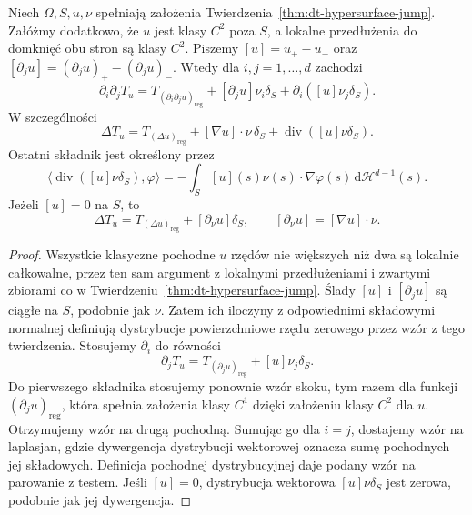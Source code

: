\begin{twierdzenie}
\label{thm:dt-second-interface}
Niech $\Omega,S,u,\nu$ spełniają założenia
Twierdzenia~\ref{thm:dt-hypersurface-jump}.
Załóżmy dodatkowo, że $u$ jest klasy $C^2$ poza $S$,
a lokalne przedłużenia do domknięć obu stron są klasy $C^2$.
Piszemy $[u]=u_+-u_-$ oraz
$[\partial_j u]=(\partial_j u)_+-(\partial_j u)_-$.
Wtedy dla $i,j=1,\ldots,d$ zachodzi
\[
 \partial_i\partial_j T_u
 =T_{(\partial_i\partial_j u)_{\mathrm{reg}}}
 +[\partial_j u]\nu_i\delta_S
 +\partial_i([u]\nu_j\delta_S).
\]
W szczególności
\[
 \Delta T_u
 =T_{(\Delta u)_{\mathrm{reg}}}
 +[\nabla u]\cdot\nu\,\delta_S
 +\operatorname{div}([u]\nu\delta_S).
\]
Ostatni składnik jest określony przez
\[
 \langle\operatorname{div}([u]\nu\delta_S),\varphi\rangle
 =-\int_S [u](s)\nu(s)\cdot\nabla\varphi(s)\,
 \mathrm d\mathcal H^{d-1}(s).
\]
Jeżeli $[u]=0$ na $S$, to
\[
 \Delta T_u=T_{(\Delta u)_{\mathrm{reg}}}
 +[\partial_\nu u]\delta_S,\qquad
 [\partial_\nu u]=[\nabla u]\cdot\nu.
\]
\end{twierdzenie}
\begin{proof}
Wszystkie klasyczne pochodne $u$ rzędów nie większych
niż dwa są lokalnie całkowalne, przez ten sam argument
z lokalnymi przedłużeniami i zwartymi zbiorami co w
Twierdzeniu~\ref{thm:dt-hypersurface-jump}.
Ślady $[u]$ i $[\partial_j u]$ są ciągłe na $S$,
podobnie jak $\nu$. Zatem ich iloczyny z odpowiednimi
składowymi normalnej definiują dystrybucje powierzchniowe
rzędu zerowego przez wzór z tego twierdzenia.
Stosujemy $\partial_i$ do równości
\[
 \partial_j T_u=T_{(\partial_j u)_{\mathrm{reg}}}
 +[u]\nu_j\delta_S.
\]
Do pierwszego składnika stosujemy ponownie wzór skoku,
tym razem dla funkcji $(\partial_j u)_{\mathrm{reg}}$,
która spełnia założenia klasy $C^1$ dzięki założeniu
klasy $C^2$ dla $u$. Otrzymujemy wzór na drugą pochodną.
Sumując go dla $i=j$, dostajemy wzór na laplasjan,
gdzie dywergencja dystrybucji wektorowej oznacza sumę
pochodnych jej składowych. Definicja pochodnej
dystrybucyjnej daje podany wzór na parowanie z testem.
Jeśli $[u]=0$, dystrybucja wektorowa $[u]\nu\delta_S$
jest zerowa, podobnie jak jej dywergencja.
\end{proof}

